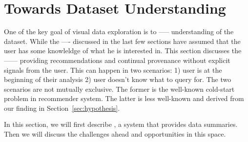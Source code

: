 \section{Towards Dataset Understanding\label{sec:understanding}}
One of the key goal of visual data exploration is to -----  understanding of the dataset. While the ---- discussed in the last few sections have assumed that the user has some knowleldge of what he is interested in. This section discusses the ------ providing recommendations and continual provenance without explicit signals from the user. This can happen in two scenarios: 1) user is at the beginning of their analysis  2) user doesn't know what to query for. The two scenarios are not mutually exclusive. The former is the well-known cold-start problem in recommender system. The latter is less well-known and derived from our finding in Section~\ref{sec:hypothesis}. 

In this section, we will first describe \sbd, a system that provides data summaries. Then we will discuss the challenges ahead and opportunities in this space.
